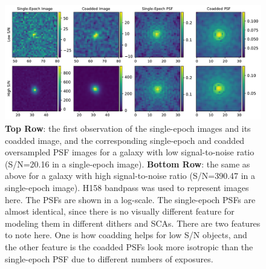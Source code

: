 \documentclass[fleqn,usenatbib]{mnras}
\begin{document}
\begin{figure}
	\includegraphics[width=\textwidth]{lowsnr_highsnr_galaxies_v2.pdf}
    \caption{\textbf{Top Row}: the first observation of the single-epoch images and its coadded image, and the corresponding single-epoch and coadded oversampled PSF images for a galaxy with low signal-to-noise ratio (S/N=20.16 in a single-epoch image). \textbf{Bottom Row}: the same as above for a galaxy with high signal-to-noise ratio (S/N=390.47 in a single-epoch image). H158 bandpass was used to represent images here. The PSFs are shown in a log-scale. The single-epoch PSFs are almost identical, since there is no visually different feature for modeling them in different dithers and SCAs. There are two features to note here. One is how coadding helps for low S/N objects, and the other feature is the coadded PSFs look more isotropic than the single-epoch PSF due to different numbers of exposures.}
    \label{fig:singlecoadd}
\end{figure}
\end{document}
